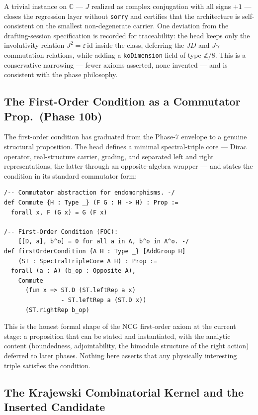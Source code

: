 \documentclass[12pt,a4paper,twoside]{article}
\theoremstyle{plain}
\theoremstyle{definition}
\theoremstyle{remark}
\begin{document}
A trivial instance on $\mathbb C$ --- $J$ realized as complex conjugation
with all signs $+1$ --- closes the regression layer without \texttt{sorry}
and certifies that the architecture is self-consistent on the smallest
non-degenerate carrier. One deviation from the drafting-session
specification is recorded for traceability: the head keeps only the
involutivity relation $J^2 = \varepsilon\,\mathrm{id}$ inside the class,
deferring the $JD$ and $J\gamma$ commutation relations, while adding a
\texttt{koDimension} field of type $\mathbb Z/8$. This is a conservative
narrowing --- fewer axioms asserted, none invented --- and is consistent
with the phase philosophy.

\subsection{The First-Order Condition as a Commutator Prop.\ (Phase 10b)}
\label{subsec:foc}

The first-order condition has graduated from the Phase-7 envelope to a
genuine structural proposition. The head defines a minimal spectral-triple
core --- Dirac operator, real-structure carrier, grading, and separated
left and right representations, the latter through an opposite-algebra
wrapper --- and states the condition in its standard commutator form:

\begin{lstlisting}
/-- Commutator abstraction for endomorphisms. -/
def Commute {H : Type _} (F G : H -> H) : Prop :=
  forall x, F (G x) = G (F x)

/-- First-Order Condition (FOC):
    [[D, a], b^o] = 0 for all a in A, b^o in A^o. -/
def firstOrderCondition {A H : Type _} [AddGroup H]
    (ST : SpectralTripleCore A H) : Prop :=
  forall (a : A) (b_op : Opposite A),
    Commute
      (fun x => ST.D (ST.leftRep a x)
                - ST.leftRep a (ST.D x))
      (ST.rightRep b_op)
\end{lstlisting}

This is the honest formal shape of the NCG first-order axiom at the
current stage: a proposition that can be stated and instantiated, with the
analytic content (boundedness, adjointability, the bimodule structure of
the right action) deferred to later phases. Nothing here asserts that any
physically interesting triple satisfies the condition.

\subsection{The Krajewski Combinatorial Kernel and the Inserted Candidate}
\label{subsec:krajewski}
\end{document}
